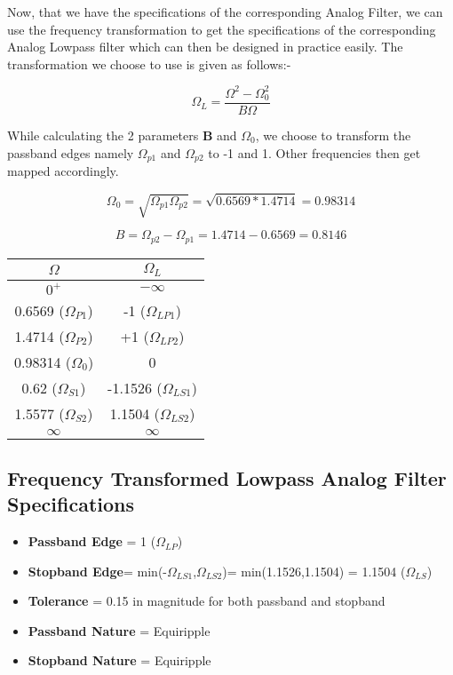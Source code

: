 \documentclass[12pt]{article}
\begin{document}
Now, that we have the specifications of the corresponding Analog Filter, we can use the frequency transformation to get the specifications of the corresponding Analog Lowpass filter which can then be designed in practice easily. The transformation we choose to use is given as follows:-

\[\Omega_{L} = \frac{\Omega^2 - \Omega_{0}^2}{B\Omega}\]

While calculating the 2 parameters \textbf{B} and \textbf{$\Omega_{0}$}, we choose to transform the passband edges namely $\Omega_{p1}$ and $\Omega_{p2}$ to -1 and 1. Other frequencies then get mapped accordingly.

\[\Omega_{0} = \sqrt{\Omega_{p1}\Omega_{p2}} = \sqrt{0.6569*1.4714} = 0.98314\]

\[B = \Omega_{p2} - \Omega_{p1} = 1.4714 - 0.6569 = 0.8146\]

\begin{center}
    \begin{tabular}{|c|c|}
     \hline
    $\Omega$ & $\Omega_{L}$ \\ \hline
    $0^+$ & $-\infty$ \\ \hline
    0.6569 ($\Omega_{P1}$) & -1 ($\Omega_{LP1}$)\\ \hline
    1.4714 ($\Omega_{P2}$) & +1 ($\Omega_{LP2}$)\\ \hline
    0.98314 ($\Omega_{0}$) & 0 \\ \hline
    0.62 ($\Omega_{S1}$) & -1.1526 ($\Omega_{LS1}$) \\ \hline
    1.5577 ($\Omega_{S2}$) & 1.1504 ($\Omega_{LS2}$) \\ \hline
    $\infty$ & $\infty$ \\ \hline
    \end{tabular}
\end{center}

\subsection{Frequency Transformed Lowpass Analog Filter Specifications}

\begin{itemize}
    \item \textbf{Passband Edge} = 1 ($\Omega_{LP}$)
    \item \textbf{Stopband Edge}= min(-$\Omega_{LS1}$,$\Omega_{LS2}$)= min(1.1526,1.1504) = 1.1504 ($\Omega_{LS}$)
    \item\textbf{Tolerance} = 0.15 in magnitude for both passband and stopband
    \item \textbf{Passband Nature} = Equiripple
    \item \textbf{Stopband Nature} = Equiripple
\end{itemize}
\end{document}
